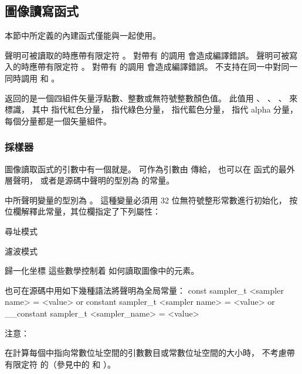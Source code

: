 \subsection{圖像讀寫函式}

本節中所定義的內建函式僅能與一起使用。

聲明可被讀取的時應帶有限定符 。
對帶有  的調用  會造成編譯錯誤。
聲明可被寫入的時應帶有限定符 。
對帶有  的調用  會造成編譯錯誤。
不支持在同一中對同一
同時調用  和 。

 返回的是一個四組件矢量浮點數、整數或無符號整數顏色值。
此值用 、 、 、  來標識，
其中  指代紅色分量，  指代綠色分量，  指代藍色分量，
  指代 alpha 分量，每個分量都是一個矢量組件。

\subsubsection{採樣器}

圖像讀取函式的引數中有一個就是。
可作為引數由  傳給，
也可以在  函式的最外層聲明，
或者是源碼中聲明的型別為  的常量。

中所聲明變量的型別為 。
這種變量必須用 32 位無符號整形常數進行初始化，
按位欄解釋此常量，其位欄指定了下列屬性：
\startigBase[indentnext=no]
\item 尋址模式
\item 濾波模式
\item 歸一化坐標
\stopigBase
這些數學控制着  如何讀取圖像中的元素。

也可在源碼中用如下幾種語法將聲明為全局常量：
\startclc
const sampler_t		<sampler name> = <value>
or
constant sampler_t	<sampler name> = <value>
or
__constant sampler_t	<sampler_name> = <value>
\stopclc

注意：

在計算每個中指向常數位址空間的引數數目或常數位址空間的大小時，
不考慮帶有限定符  的（參見中的
  和
 ）。

